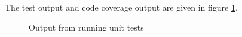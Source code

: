 The test output and code coverage output are given in figure \ref{fig:test-out}.
\begin{figure}[!htb]
	\centering
	\qquad
	\caption{Output from running unit tests}
	\label{fig:test-out}
\end{figure}